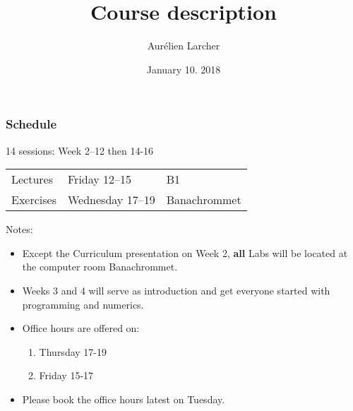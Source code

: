 

\title{Course description}
\date{January 10. 2018}
\author{Aurélien Larcher}
\maketitle

\begin{frame}
  \frametitle{Schedule}

14 sessions: Week 2--12 then 14-16
\medskip

\begin{center}
\begin{tabular}{|l|l|l|}
\hline
Lectures   & Friday 12--15    & B1          \\
Exercises  & Wednesday 17--19 & Banachrommet \\
\hline
\end{tabular}
\end{center}

Notes:
\begin{itemize}
\item Except the Curriculum presentation on Week 2, \textbf{all} Labs will be located at the computer room Banachrommet.
\item Weeks 3 and 4 will serve as introduction and get everyone started with programming and numerics.
\item Office hours are offered on:
\begin{enumerate}
\item Thursday 17-19
\item Friday 15-17
\end{enumerate}
\item Please book the office hours latest on Tuesday.
\end{itemize}

\end{frame}

